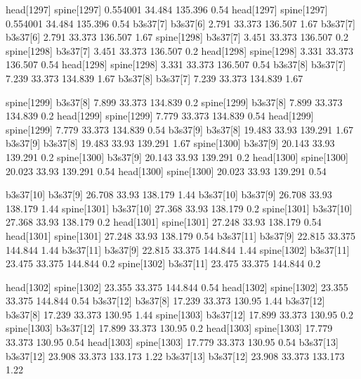 head[1297]    spine[1297]    0.554001    34.484    135.396    0.54
head[1297]    spine[1297]    0.554001    34.484    135.396    0.54
b3s37[7]    b3s37[6]    2.791    33.373    136.507    1.67
b3s37[7]    b3s37[6]    2.791    33.373    136.507    1.67
spine[1298]    b3s37[7]    3.451    33.373    136.507    0.2
spine[1298]    b3s37[7]    3.451    33.373    136.507    0.2
head[1298]    spine[1298]    3.331    33.373    136.507    0.54
head[1298]    spine[1298]    3.331    33.373    136.507    0.54
b3s37[8]    b3s37[7]    7.239    33.373    134.839    1.67
b3s37[8]    b3s37[7]    7.239    33.373    134.839    1.67


spine[1299]    b3s37[8]    7.899    33.373    134.839    0.2
spine[1299]    b3s37[8]    7.899    33.373    134.839    0.2
head[1299]    spine[1299]    7.779    33.373    134.839    0.54
head[1299]    spine[1299]    7.779    33.373    134.839    0.54
b3s37[9]    b3s37[8]    19.483    33.93    139.291    1.67
b3s37[9]    b3s37[8]    19.483    33.93    139.291    1.67
spine[1300]    b3s37[9]    20.143    33.93    139.291    0.2
spine[1300]    b3s37[9]    20.143    33.93    139.291    0.2
head[1300]    spine[1300]    20.023    33.93    139.291    0.54
head[1300]    spine[1300]    20.023    33.93    139.291    0.54


b3s37[10]    b3s37[9]    26.708    33.93    138.179    1.44
b3s37[10]    b3s37[9]    26.708    33.93    138.179    1.44
spine[1301]    b3s37[10]    27.368    33.93    138.179    0.2
spine[1301]    b3s37[10]    27.368    33.93    138.179    0.2
head[1301]    spine[1301]    27.248    33.93    138.179    0.54
head[1301]    spine[1301]    27.248    33.93    138.179    0.54
b3s37[11]    b3s37[9]    22.815    33.375    144.844    1.44
b3s37[11]    b3s37[9]    22.815    33.375    144.844    1.44
spine[1302]    b3s37[11]    23.475    33.375    144.844    0.2
spine[1302]    b3s37[11]    23.475    33.375    144.844    0.2


head[1302]    spine[1302]    23.355    33.375    144.844    0.54
head[1302]    spine[1302]    23.355    33.375    144.844    0.54
b3s37[12]    b3s37[8]    17.239    33.373    130.95    1.44
b3s37[12]    b3s37[8]    17.239    33.373    130.95    1.44
spine[1303]    b3s37[12]    17.899    33.373    130.95    0.2
spine[1303]    b3s37[12]    17.899    33.373    130.95    0.2
head[1303]    spine[1303]    17.779    33.373    130.95    0.54
head[1303]    spine[1303]    17.779    33.373    130.95    0.54
b3s37[13]    b3s37[12]    23.908    33.373    133.173    1.22
b3s37[13]    b3s37[12]    23.908    33.373    133.173    1.22


